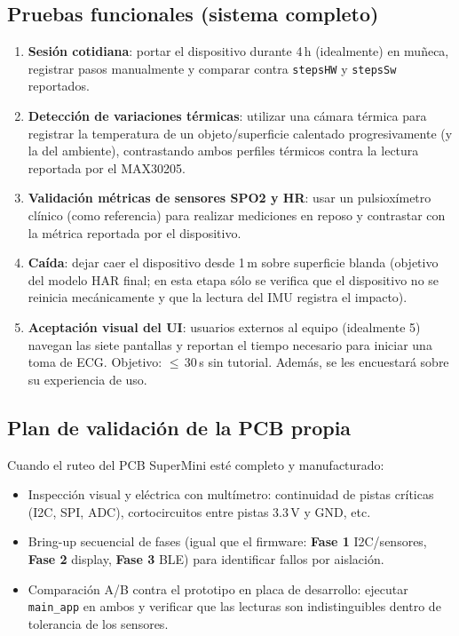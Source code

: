 \documentclass[letterpaper,11pt]{article}
\begin{document}
\subsection{Pruebas funcionales (sistema completo)}
\begin{enumerate}
    \item \textbf{Sesión cotidiana}: portar el dispositivo durante 4\,h (idealmente) en muñeca, registrar
    pasos manualmente y comparar contra \texttt{stepsHW} y \texttt{stepsSw} reportados.
    \item \textbf{Detección de variaciones térmicas}: utilizar una cámara térmica para registrar la
    temperatura de un objeto/superficie calentado progresivamente (y la del ambiente),
    contrastando ambos perfiles térmicos contra la lectura reportada por el MAX30205.
    \item \textbf{Validación métricas de sensores SPO2 y HR}: usar un pulsioxímetro clínico (como referencia) para realizar mediciones en reposo y contrastar con la métrica reportada por el dispositivo.
    \item \textbf{Caída}: dejar caer el dispositivo desde 1\,m sobre superficie blanda
    (objetivo del modelo HAR final; en esta etapa sólo se verifica que el
    dispositivo no se reinicia mecánicamente y que la lectura del IMU registra el impacto).
    \item \textbf{Aceptación visual del UI}: usuarios externos al equipo (idealmente 5) navegan las
    siete pantallas y reportan el tiempo necesario para iniciar una toma de ECG. Objetivo:
    $\leq$\,30\,s sin tutorial. Además, se les encuestará sobre su experiencia de uso.
\end{enumerate}

\subsection{Plan de validación de la PCB propia}
Cuando el ruteo del PCB SuperMini esté completo y manufacturado:
\begin{itemize}
    \item Inspección visual y eléctrica con multímetro: continuidad de pistas críticas (I2C,
    SPI, ADC), cortocircuitos entre pistas 3.3\,V y GND, etc.
    \item Bring-up secuencial de fases (igual que el firmware: \textbf{Fase 1} I2C/sensores,
    \textbf{Fase 2} display, \textbf{Fase 3} BLE) para identificar fallos por aislación.
    \item Comparación A/B contra el prototipo en placa de desarrollo: ejecutar \texttt{main\_app}
    en ambos y verificar que las lecturas son indistinguibles dentro de tolerancia de los
    sensores.
\end{itemize}
\end{document}

